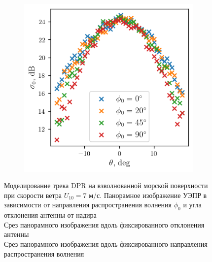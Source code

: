 \documentclass{article}
\begin{document}
\begin{figure}[t]
    \begin{subfigure}{\linewidth}
        \centering
        \includegraphics[width=0.6\linewidth]{figs/direction_slices.png}
        \caption{}
        \label{scap:crosssec_direction:3}
    \end{subfigure}
    \caption{
    Моделирование трека DPR на взволнованной морской поверхности при
        скорости ветра $U_{10}=7$ м/с.
         Панорамное изображение УЭПР в
        зависимости от направления распространения волнения $\phi_0$ и
        угла отклонения антенны от надира
        \\
         Срез панорамного изображения
        вдоль фиксированного отклонения антенны
        \\
         Срез панорамного изображения
        вдоль фиксированного направления распространения волнения
    }
    \label{fig:crosssec_clices}
\end{figure}
\end{document}
